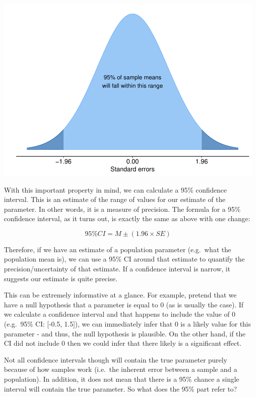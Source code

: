 \documentclass[
]{book}
\begin{document}
\begin{center}\includegraphics{_main_files/figure-latex/unnamed-chunk-101-1} \end{center}

With this important property in mind, we can calculate a 95\% confidence interval. This is an estimate of the range of values for our estimate of the parameter. In other words, it is a measure of precision. The formula for a 95\% confidence interval, as it turns out, is exactly the same as above with one change:

\[
95\% CI = M \pm (1.96 \times SE)
\]

Therefore, if we have an estimate of a population parameter (e.g.~what the population mean is), we can use a 95\% CI around that estimate to quantify the precision/uncertainty of that estimate. If a confidence interval is narrow, it suggests our estimate is quite precise.

This can be extremely informative at a glance. For example, pretend that we have a null hypothesis that a parameter is equal to 0 (as is usually the case). If we calculate a confidence interval and that happens to include the value of 0 (e.g.~95\% CI: {[}-0.5, 1.5{]}), we can immediately infer that 0 is a likely value for this parameter - and thus, the null hypothesis is plausible. On the other hand, if the CI did not include 0 then we could infer that there likely is a significant effect.

Not all confidence intervals though will contain the true parameter purely because of how samples work (i.e.~the inherent error between a sample and a population). In addition, it does not mean that there is a 95\% chance a single interval will contain the true parameter. So what does the 95\% part refer to?
\end{document}
